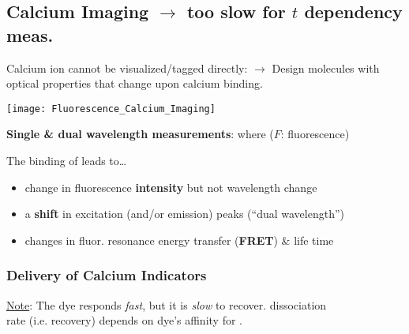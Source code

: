 \subsection{Calcium Imaging \textnormal{\hfill $\to$ too slow for $t$ dependency meas.}}
%
Calcium ion cannot be visualized/tagged directly:
$\to$
Design molecules with optical properties that change upon calcium binding.

\begin{minipage}{.23\columnwidth}
    \texttt{[image: Fluorescence\_Calcium\_Imaging]}
\end{minipage}%
\hspace{\columnsep}%
\begin{minipage}{.77\columnwidth-\columnsep}
    \textbf{Single \& dual wavelength measurements}: 
    where
    \qquad ($F$: fluorescence)
%
\end{minipage}

The binding of  leads to\ldots
\begin{itemize}
    \item change in fluorescence \textbf{intensity} but not wavelength change
    \item a \textbf{shift} in excitation (and/or emission) peaks (``dual wavelength'')
    \item changes in fluor. resonance energy transfer (\textbf{FRET}) \& life time
\end{itemize}
\subsubsection{Delivery of Calcium Indicators}
%


\underline{Note}: The dye responds \textit{fast}, but it is \textit{slow} to recover.  dissociation\\
 rate (i.e. recovery) depends on dye’s affinity for .
